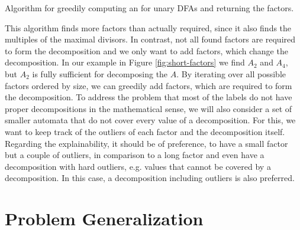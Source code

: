 \begin{algorithm}[h]
	\label{algo:composite}
	\DontPrintSemicolon
	
	
	\caption{Algorithm for greedily computing an \orDecomp for unary DFAs and returning the factors.}
\end{algorithm}
This algorithm finds more factors than actually required, since it also finds the multiples of the maximal divisors.
In contrast, not all found factors are required to form the decomposition and we only want to add factors, which change the decomposition.
In our example in Figure \ref{fig:short-factors} we find $A_2$ and $A_4$, but $A_2$ is fully sufficient for decomposing the \DFA $A$.
By iterating over all possible factors ordered by size, we can greedily add factors, which are required to form the decomposition.
To address the problem that most of the labels do not have proper decompositions in the mathematical sense, we will also consider a set of smaller automata that do not cover every value of a decomposition.
For this, we want to keep track of the outliers of each factor and the decomposition itself.
Regarding the explainability, it should be of preference, to have a small factor but a couple of outliers, in comparison to a long factor and even have a decomposition with hard outliers, e.g. values that cannot be covered by a decomposition.
In this case, a decomposition including outliers is also preferred.

\section{Problem Generalization}

